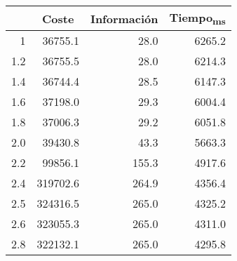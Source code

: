 \documentclass{article}
\begin{document}
    \begin{center}
    \begin{tabular}{ | r | r | r | r | }
      \hline
      \rowcolor{DarkGrey}
      \multicolumn{1}{|c|}{Peso información} & \multicolumn{1}{|c|}{Coste} & \multicolumn{1}{|c|}{Información} & \multicolumn{1}{|c|}{Tiempo\textsubscript{ms}} \\ \hline \hline
      1 & 36755.1 & 28.0 & 6265.2 \\ \hline
      \rowcolor{LightGrey}
      1.2 & 36755.5 & 28.0 & 6214.3 \\ \hline
      1.4 & 36744.4 & 28.5 & 6147.3 \\ \hline
      \rowcolor{LightGrey}
      1.6 & 37198.0 & 29.3 & 6004.4 \\ \hline
      1.8 & 37006.3 & 29.2 & 6051.8 \\ \hline
      \rowcolor{LightGrey}
      2.0 & 39430.8 & 43.3 & 5663.3 \\ \hline
      2.2 & 99856.1 & 155.3 & 4917.6 \\ \hline
      \rowcolor{LightGrey}
      2.4 & 319702.6 & 264.9 & 4356.4 \\ \hline
      2.5 & 324316.5 & 265.0 & 4325.2 \\ \hline
      \rowcolor{LightGrey}
      2.6 & 323055.3 & 265.0 & 4311.0 \\ \hline
      2.8 & 322132.1 & 265.0 & 4295.8 \\ \hline
    \end{tabular}
    \label{table:T7}
  \end{center}
\end{document}
